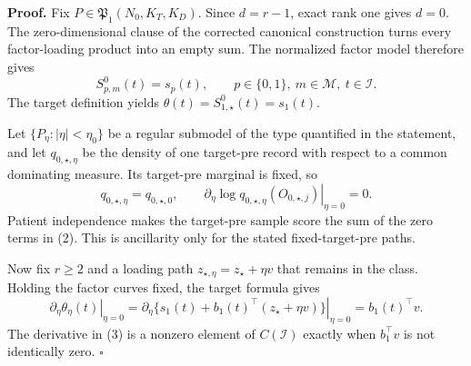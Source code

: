 \textbf{Proof.}
Fix \(P\in\mathfrak P_1(N_0,K_T,K_D)\). Since \(d=r-1\), exact rank one gives \(d=0\). The zero-dimensional clause of the corrected canonical construction turns every factor-loading product into an empty sum. The normalized factor model therefore gives
\[
 S^0_{p,m}(t)=s_p(t),
 \qquad p\in\{0,1\},\ m\in\mathcal M,\ t\in\mathcal I. \tag{1}
\]
The target definition yields \(\theta(t)=S^0_{1,\star}(t)=s_1(t)\).

Let \(\{P_\eta:|\eta|<\eta_0\}\) be a regular submodel of the type quantified in the statement, and let \(q_{0,\star,\eta}\) be the density of one target-pre record with respect to a common dominating measure. Its target-pre marginal is fixed, so
\[
 q_{0,\star,\eta}=q_{0,\star,0},
 \qquad
 \left.\partial_\eta\log q_{0,\star,\eta}(O_{0,\star,j})
 \right|_{\eta=0}=0.                                     \tag{2}
\]
Patient independence makes the target-pre sample score the sum of the zero terms in (2). This is ancillarity only for the stated fixed-target-pre paths.

Now fix \(r\ge2\) and a loading path \(z_{\star,\eta}=z_\star+\eta v\) that remains in the class. Holding the factor curves fixed, the target formula gives
\[
 \left.\partial_\eta\theta_\eta(t)\right|_{\eta=0}
 =\left.\partial_\eta\{s_1(t)+b_1(t)^\top(z_\star+\eta v)\}
 \right|_{\eta=0}=b_1(t)^\top v.                        \tag{3}
\]
The derivative in (3) is a nonzero element of \(C(\mathcal I)\) exactly when \(b_1^\top v\) is not identically zero. \(\square\)